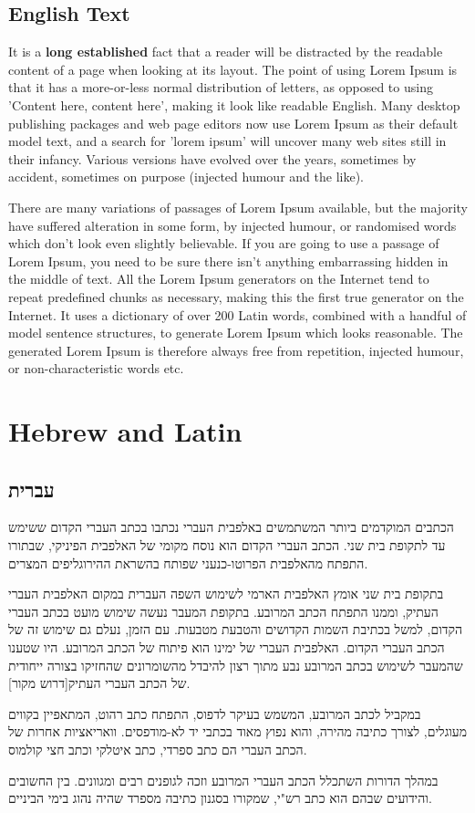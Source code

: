 \documentclass[11pt,pdfa,en]{MishoText}
\begin{document}
\section{English Text}
It is a \textbf{long established} fact that a reader will be distracted by the readable content of a page when looking at its layout. The point of using Lorem Ipsum is that it has a more-or-less normal distribution of letters, as opposed to using 'Content here, content here', making it look like readable English. Many desktop publishing packages and web page editors now use Lorem Ipsum as their default model text, and a search for 'lorem ipsum' will uncover many web sites still in their infancy. Various versions have evolved over the years, sometimes by accident, sometimes on purpose (injected humour and the like).

There are many variations of passages of Lorem Ipsum available, but the majority have suffered alteration in some form, by injected humour, or randomised words which don't look even slightly believable. If you are going to use a passage of Lorem Ipsum, you need to be sure there isn't anything embarrassing hidden in the middle of text. All the Lorem Ipsum generators on the Internet tend to repeat predefined chunks as necessary, making this the first true generator on the Internet. It uses a dictionary of over 200 Latin words, combined with a handful of model sentence structures, to generate Lorem Ipsum which looks reasonable. The generated Lorem Ipsum is therefore always free from repetition, injected humour, or non-characteristic words etc.

\chapter{Hebrew and Latin}
\begin{hebrew}
\section{עברית}
הכתבים המוקדמים ביותר המשתמשים באלפבית העברי נכתבו בכתב העברי הקדום ששימש עד לתקופת בית שני. הכתב העברי הקדום הוא נוסח מקומי של האלפבית הפיניקי, שבתורו התפתח מהאלפבית הפרוטו-כנעני שפותח בהשראת ההירוגליפים המצרים.

בתקופת בית שני אומץ האלפבית הארמי לשימוש השפה העברית במקום האלפבית העברי העתיק, וממנו התפתח הכתב המרובע. בתקופת המעבר נעשה שימוש מועט בכתב העברי הקדום, למשל בכתיבת השמות הקדושים והטבעת מטבעות. עם הזמן, נעלם גם שימוש זה של הכתב העברי הקדום. האלפבית העברי של ימינו הוא פיתוח של הכתב המרובע. היו שטענו שהמעבר לשימוש בכתב המרובע נבע מתוך רצון להיבדל מהשומרונים שהחזיקו בצורה ייחודית של הכתב העברי העתיק[דרוש מקור].

במקביל לכתב המרובע, המשמש בעיקר לדפוס, התפתח כתב רהוט, המתאפיין בקווים מעוגלים, לצורך כתיבה מהירה, והוא נפוץ מאוד בכתבי יד לא-מודפסים. וואריאציות אחרות של הכתב העברי הם כתב ספרדי, כתב איטלקי וכתב חצי קולמוס.

במהלך הדורות השתכלל הכתב העברי המרובע וזכה לגופנים רבים ומגוונים. בין החשובים והידועים שבהם הוא כתב רש"י, שמקורו בסגנון כתיבה מספרד שהיה נהוג בימי הביניים. 
\end{hebrew}

\lipsum[1]
\end{document}
